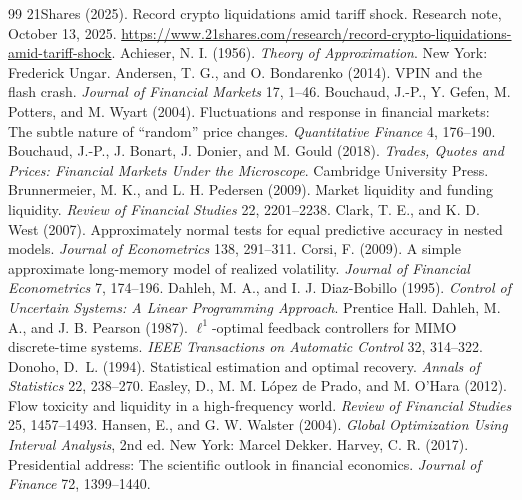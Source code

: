 \begin{thebibliography}{99}\setlength{\itemsep}{2pt}\small
{} 21Shares (2025). Record crypto liquidations amid tariff shock. Research note, October 13, 2025. \url{https://www.21shares.com/research/record-crypto-liquidations-amid-tariff-shock}.
 Achieser, N. I. (1956). \emph{Theory of Approximation}. New York: Frederick Ungar.
 Andersen, T. G., and O. Bondarenko (2014). VPIN and the flash crash. \emph{Journal of Financial Markets} 17, 1--46.
 Bouchaud, J.-P., Y. Gefen, M. Potters, and M. Wyart (2004). Fluctuations and response in financial markets: The subtle nature of ``random'' price changes. \emph{Quantitative Finance} 4, 176--190.
 Bouchaud, J.-P., J. Bonart, J. Donier, and M. Gould (2018). \emph{Trades, Quotes and Prices: Financial Markets Under the Microscope}. Cambridge University Press.
 Brunnermeier, M. K., and L. H. Pedersen (2009). Market liquidity and funding liquidity. \emph{Review of Financial Studies} 22, 2201--2238.
 Clark, T. E., and K. D. West (2007). Approximately normal tests for equal predictive accuracy in nested models. \emph{Journal of Econometrics} 138, 291--311.
 Corsi, F. (2009). A simple approximate long-memory model of realized volatility. \emph{Journal of Financial Econometrics} 7, 174--196.
 Dahleh, M. A., and I. J. Diaz-Bobillo (1995). \emph{Control of Uncertain Systems: A Linear Programming Approach}. Prentice Hall.
 Dahleh, M. A., and J. B. Pearson (1987). $\ell^1$-optimal feedback controllers for MIMO discrete-time systems. \emph{IEEE Transactions on Automatic Control} 32, 314--322.
 Donoho, D.~L. (1994). Statistical estimation and optimal recovery. \emph{Annals of Statistics} 22, 238--270.
 Easley, D., M. M. L\'opez de Prado, and M. O'Hara (2012). Flow toxicity and liquidity in a high-frequency world. \emph{Review of Financial Studies} 25, 1457--1493.
 Hansen, E., and G. W. Walster (2004). \emph{Global Optimization Using Interval Analysis}, 2nd ed. New York: Marcel Dekker.
 Harvey, C. R. (2017). Presidential address: The scientific outlook in financial economics. \emph{Journal of Finance} 72, 1399--1440.

\end{thebibliography}

